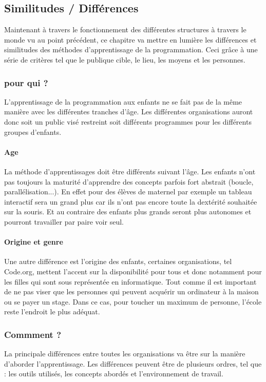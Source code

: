 \subsection{Similitudes / Différences}
Maintenant à travers le fonctionnement des  différentes structures à travers le monde vu au point précédent, ce chapitre va mettre en lumière les différences et similitudes des méthodes d'apprentissage de la programmation. Ceci grâce à une série de critères tel que le publique cible, le lieu, les moyens et les personnes.
\subsubsection{pour qui ?}
L'apprentissage de la programmation aux enfants ne se fait pas de la même manière avec les différentes tranches d'âge. Les différentes organisations auront donc soit un public visé restreint soit différents programmes pour les différents groupes d'enfants. 

\paragraph{Age}
La méthode d'apprentissages doit être différents suivant l'âge. Les enfants n'ont pas toujours la maturité d'apprendre des concepts parfois fort abstrait (boucle, parallélisation...). En effet pour des élèves de maternel par exemple un tableau interactif sera un grand plus car ils n'ont pas encore toute la dextérité souhaitée sur la souris. Et au contraire des enfants plus grands seront plus autonomes et pourront travailler par paire voir seul.

\paragraph{Origine et genre}
Une autre différence est l'origine des enfants, certaines organisations, tel Code.org, mettent l'accent sur la disponibilité pour tous et donc notamment pour les filles qui sont sous représentée en informatique. Tout comme il est important de ne pas viser que les personnes qui peuvent acquérir un ordinateur à la maison ou se payer un stage. Dans ce cas, pour toucher un maximum de personne, l'école reste l'endroit le plus adéquat.

\subsubsection{Commment ?}
La principale différences entre toutes les organisations va être sur la manière d'aborder l'apprentissage. Les différences peuvent être de plusieurs ordres, tel que : les outils utilisés, les concepts abordés et l'environnement de travail.

